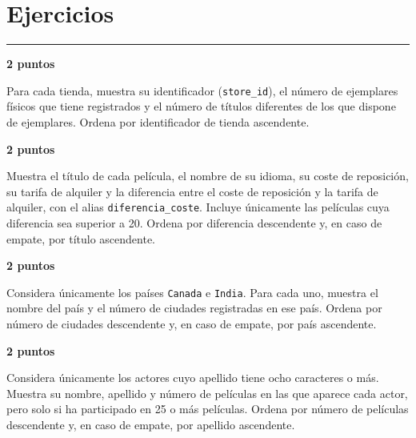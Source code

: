 \documentclass[11pt,a4paper]{article}
\begin{document}
\section*{Ejercicios}\vspace{-3mm}\color{LBcereza}\rule{\textwidth}{0.5pt}\color{LBtexto}
\par\medskip{}\hfill{\color{LBcereza}\bfseries 2 puntos}\par\smallskip
Para cada tienda, muestra su identificador (\texttt{store\_id}), el número de ejemplares físicos que tiene registrados y el número de títulos diferentes de los que dispone de ejemplares. Ordena por identificador de tienda ascendente.\par\medskip
{}
\par\medskip{}\hfill{\color{LBcereza}\bfseries 2 puntos}\par\smallskip
Muestra el título de cada película, el nombre de su idioma, su coste de reposición, su tarifa de alquiler y la diferencia entre el coste de reposición y la tarifa de alquiler, con el alias \texttt{diferencia\_coste}. Incluye únicamente las películas cuya diferencia sea superior a 20. Ordena por diferencia descendente y, en caso de empate, por título ascendente.\par\medskip
{}
\par\medskip{}\hfill{\color{LBcereza}\bfseries 2 puntos}\par\smallskip
Considera únicamente los países \texttt{Canada} e \texttt{India}. Para cada uno, muestra el nombre del país y el número de ciudades registradas en ese país. Ordena por número de ciudades descendente y, en caso de empate, por país ascendente.\par\medskip
\newpage
{}
\par\medskip{}\hfill{\color{LBcereza}\bfseries 2 puntos}\par\smallskip
Considera únicamente los actores cuyo apellido tiene ocho caracteres o más. Muestra su nombre, apellido y número de películas en las que aparece cada actor, pero solo si ha participado en 25 o más películas. Ordena por número de películas descendente y, en caso de empate, por apellido ascendente.\par\medskip
\end{document}
